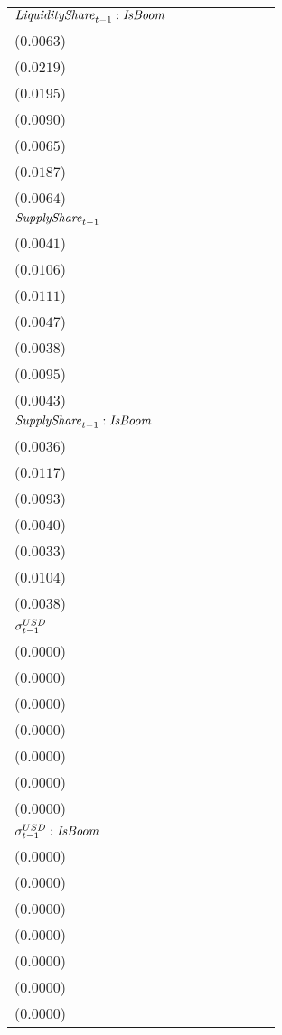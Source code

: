 \begin{tabular}{llllllll}
${\it LiquidityShare}_{t-1}:{\it IsBoom}$ & \makecell{$-0.0147^{**}$ \\ ($0.0063$)} & \makecell{$-0.0062^{}$ \\ ($0.0219$)} & \makecell{$0.0291^{}$ \\ ($0.0195$)} & \makecell{$0.0218^{**}$ \\ ($0.0090$)} & \makecell{$0.0120^{*}$ \\ ($0.0065$)} & \makecell{$-0.0060^{}$ \\ ($0.0187$)} & \makecell{$-0.0075^{}$ \\ ($0.0064$)} \\
${\it SupplyShare}_{t-1}$ & \makecell{$0.0176^{***}$ \\ ($0.0041$)} & \makecell{$0.0329^{***}$ \\ ($0.0106$)} & \makecell{$0.0469^{***}$ \\ ($0.0111$)} & \makecell{$0.0094^{**}$ \\ ($0.0047$)} & \makecell{$0.0043^{}$ \\ ($0.0038$)} & \makecell{$0.0351^{***}$ \\ ($0.0095$)} & \makecell{$0.0216^{***}$ \\ ($0.0043$)} \\
${\it SupplyShare}_{t-1}:{\it IsBoom}$ & \makecell{$-0.0020^{}$ \\ ($0.0036$)} & \makecell{$0.0169^{}$ \\ ($0.0117$)} & \makecell{$-0.0265^{***}$ \\ ($0.0093$)} & \makecell{$-0.0040^{}$ \\ ($0.0040$)} & \makecell{$-0.0015^{}$ \\ ($0.0033$)} & \makecell{$0.0107^{}$ \\ ($0.0104$)} & \makecell{$-0.0051^{}$ \\ ($0.0038$)} \\
${\it \sigma}^{USD}_{t-1}$ & \makecell{$-0.0000^{**}$ \\ ($0.0000$)} & \makecell{$-0.0000^{*}$ \\ ($0.0000$)} & \makecell{$0.0000^{}$ \\ ($0.0000$)} & \makecell{$0.0000^{*}$ \\ ($0.0000$)} & \makecell{$0.0000^{}$ \\ ($0.0000$)} & \makecell{$-0.0000^{}$ \\ ($0.0000$)} & \makecell{$-0.0000^{}$ \\ ($0.0000$)} \\
${\it \sigma}^{USD}_{t-1}:{\it IsBoom}$ & \makecell{$0.0000^{***}$ \\ ($0.0000$)} & \makecell{$0.0001^{***}$ \\ ($0.0000$)} & \makecell{$-0.0000^{***}$ \\ ($0.0000$)} & \makecell{$-0.0000^{***}$ \\ ($0.0000$)} & \makecell{$-0.0000^{***}$ \\ ($0.0000$)} & \makecell{$0.0000^{***}$ \\ ($0.0000$)} & \makecell{$0.0000^{***}$ \\ ($0.0000$)} \\

\end{tabular}
